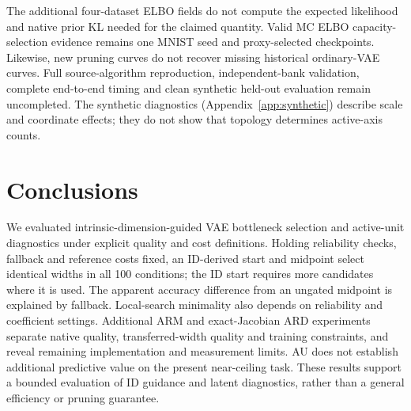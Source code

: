 \documentclass[make,article,submit,pdftex,moreauthors]{Definitions/mdpi}
\begin{document}
The additional four-dataset ELBO fields do not compute the expected
likelihood and native prior KL needed for the claimed quantity. Valid
MC ELBO capacity-selection evidence remains one MNIST seed and
proxy-selected checkpoints. Likewise, new pruning curves do not recover
missing historical ordinary-VAE curves. Full source-algorithm reproduction,
independent-bank validation, complete end-to-end timing and clean synthetic
held-out evaluation remain uncompleted. The synthetic diagnostics
(Appendix~\ref{app:synthetic}) describe scale and coordinate effects;
they do not show that topology determines active-axis counts.

\section{Conclusions}\label{sec:conclusion}
We evaluated intrinsic-dimension-guided VAE bottleneck selection and
active-unit diagnostics under explicit quality and cost definitions.
Holding reliability checks, fallback and reference costs fixed, an
ID-derived start and midpoint select identical widths in all 100
conditions; the ID start requires more candidates where it is used.
The apparent accuracy difference from an ungated midpoint is explained
by fallback. Local-search minimality also depends on reliability and
coefficient settings. Additional ARM and exact-Jacobian ARD experiments
separate native quality, transferred-width quality and training constraints,
and reveal remaining implementation and measurement limits. AU does
not establish additional predictive value on the present near-ceiling
task. These results support a bounded evaluation of ID guidance and
latent diagnostics, rather than a general efficiency or pruning guarantee.
\end{document}

